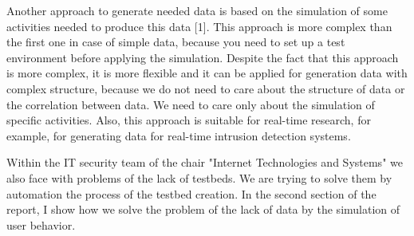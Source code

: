 

Another approach to generate needed data is based on the simulation of some activities needed to produce this data [1]. This approach is more complex than the first one in case of simple data, because you need to set up a test environment before applying the simulation. Despite the fact that this approach is more complex, it is more flexible and it can be applied for generation data with complex structure, because we do not need to care about the structure of data or the correlation between data. We need to care only about the simulation of specific activities. Also, this approach is suitable for real-time research, for example, for generating data for real-time intrusion detection systems. 

 

Within the IT security team of the chair "Internet Technologies and Systems" we also face with problems of the lack of testbeds. We are trying to solve them by automation the process of the testbed creation. In the second section of the report, I show how we solve the problem of the lack of data by the simulation of user behavior.



